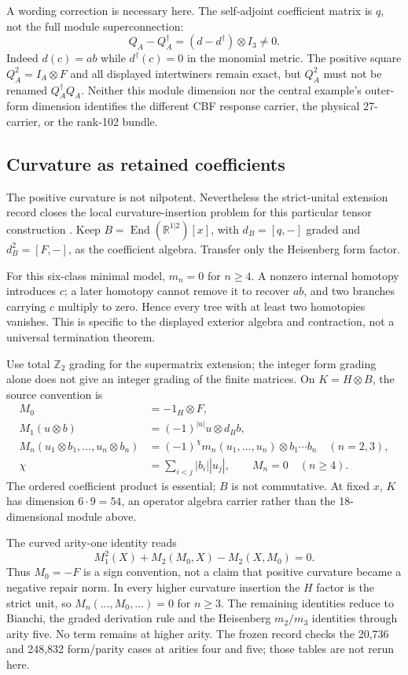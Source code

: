 \documentclass[11pt,a4paper]{article}
\begin{document}
A wording correction is necessary here. The self-adjoint coefficient
matrix is \(q\), not the full module superconnection:
\[
 Q_A-Q_A^\dagger=(d-d^\dagger)\otimes I_3\ne0.
\]
Indeed \(d(c)=ab\) while \(d^\dagger(c)=0\) in the monomial metric.
The positive square \(Q_A^2=I_A\otimes F\) and all displayed
intertwiners remain exact, but \(Q_A^2\) must not be renamed
\(Q_A^\dagger Q_A\). Neither this module dimension nor the central
example's outer-form dimension identifies the different CBF response
carrier, the physical 27-carrier, or the rank-102 bundle.

\subsection{Curvature as retained coefficients}
\label{sec:unital-curved-coefficients}
The positive curvature is not nilpotent. Nevertheless the strict-unital
extension record closes the local curvature-insertion problem for this
particular tensor construction \cite{PreprojectionUnitalCurvature2026}.
Keep \(B=\operatorname{End}(\mathbb R^{1|2})[x]\), with
\(d_B=[q,-]\) graded and \(d_B^2=[F,-]\), as the coefficient algebra.
Transfer only the Heisenberg form factor.

For this six-class minimal model, \(m_n=0\) for \(n\geq4\).
A nonzero internal homotopy introduces \(c\); a later homotopy cannot
remove it to recover \(ab\), and two branches carrying \(c\) multiply
to zero. Hence every tree with at least two homotopies vanishes.
This is specific to the displayed exterior algebra and contraction,
not a universal termination theorem.

Use total \(\mathbb Z_2\) grading for the supermatrix extension;
the integer form grading alone does not give an integer grading of
the finite matrices. On \(K=H\otimes B\), the source convention is
\begin{align*}
 M_0&=-1_H\otimes F,\\
 M_1(u\otimes b)&=(-1)^{|u|}u\otimes d_Bb,\\
 M_n(u_1\otimes b_1,\ldots,u_n\otimes b_n)
 &=(-1)^\chi m_n(u_1,\ldots,u_n)\otimes b_1\cdots b_n
 \quad(n=2,3),\\
 \chi&=\sum_{i<j}|b_i||u_j|,\qquad M_n=0\quad(n\geq4).
\end{align*}
The ordered coefficient product is essential; \(B\) is not commutative.
At fixed \(x\), \(K\) has dimension \(6\cdot9=54\), an operator
algebra carrier rather than the 18-dimensional module above.

The curved arity-one identity reads
\[
 M_1^2(X)+M_2(M_0,X)-M_2(X,M_0)=0.
\]
Thus \(M_0=-F\) is a sign convention, not a claim that positive
curvature became a negative repair norm. In every higher curvature
insertion the \(H\) factor is the strict unit, so
\(M_n(\ldots,M_0,\ldots)=0\) for \(n\geq3\).
The remaining identities reduce to Bianchi, the graded derivation rule
and the Heisenberg \(m_2/m_3\) identities through arity five. No term
remains at higher arity. The frozen record checks the 20,736 and
248,832 form/parity cases at arities four and five; those tables are
not rerun here.
\end{document}
